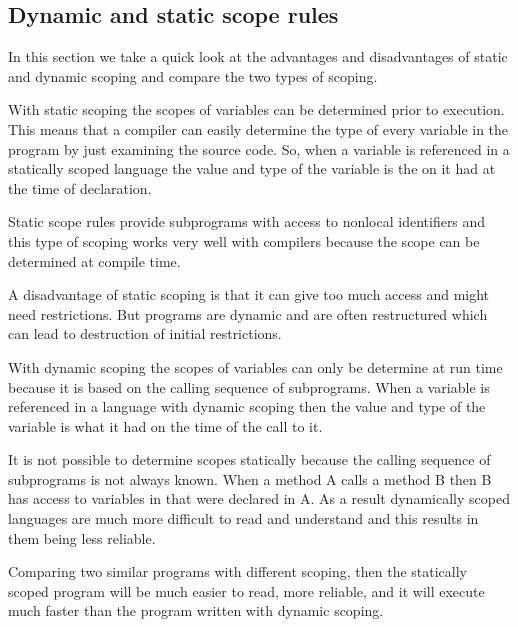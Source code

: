 \subsection{Dynamic and static scope rules}

In this section we take a quick look at the advantages and disadvantages of
static and dynamic scoping and compare the two types of scoping.

With static scoping the scopes of variables can be determined prior to
execution. This means that a compiler can easily determine the type of every
variable in the program by just examining the source code. So, when a variable
is referenced in a statically scoped language the value and type of the variable 
is the on it had at the time of declaration.
\cite[5.5.1, p. X]{sebesta2013}

Static scope rules provide subprograms with access to nonlocal identifiers and
this type of scoping works very well with compilers because the scope can be
determined at compile time.
\cite[5.5.5, p. X]{sebesta2013}

A disadvantage of static scoping is that it can give too much access and might
need restrictions. But programs are dynamic and are often restructured which
can lead to destruction of initial restrictions.
\cite[5.5.5, p. X]{sebesta2013}

With dynamic scoping the scopes of variables can only be determine at run time
because it is based on the calling sequence of subprograms. When a variable is
referenced in a language with dynamic scoping then the value and type of the 
variable is what it had on the time of the call to it.
\cite[5.5.6, p. X]{sebesta2013}

It is not possible to determine scopes statically because the calling sequence
of subprograms is not always known. When a method A calls a method B then B has 
access to variables in that were declared in A. As a result dynamically scoped
languages are much more difficult to read and understand and this results in
them being less reliable.
\cite[5.5.7, p. X]{sebesta2013}

Comparing two similar programs with different scoping, then the statically
scoped program will be much easier to read, more reliable, and it will execute
much faster than the program written with dynamic scoping.
\cite[5.5.7, p. X]{sebesta2013}
